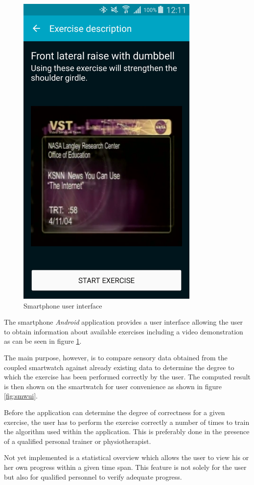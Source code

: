 \begin{figure}[t!]
\begin{minipage}{0.25\textwidth}
        \includegraphics[width=0.80\textwidth]{00_resources/figures/Android_Phone_DescriptionView.png}
    \end{minipage}
  \caption{Smartphone user interface}
  \label{fig:smpui}
\end{figure}

The smartphone \textit{Android} application provides a user interface allowing
the user to obtain information about available exercises including a video
demonstration as can be seen in figure \ref{fig:smpui}.

The main purpose, however, is to compare sensory data obtained from the coupled
smartwatch against already existing data to determine the degree to which
the exercise has been performed correctly by the user. The computed result is
then shown on the smartwatch for user convenience as shown in figure
\ref{fig:smwui}.

Before the application can determine the degree of correctness for a given
exercise, the user has to perform the exercise correctly a number of times to
train the algorithm used within the application. This is preferably done in
the presence of a qualified personal trainer or physiotherapist.

Not yet implemented is a statistical overview which allows the user to view his
or her own progress within a given time span. This feature is not solely for
the user but also for qualified personnel to verify adequate progress.
